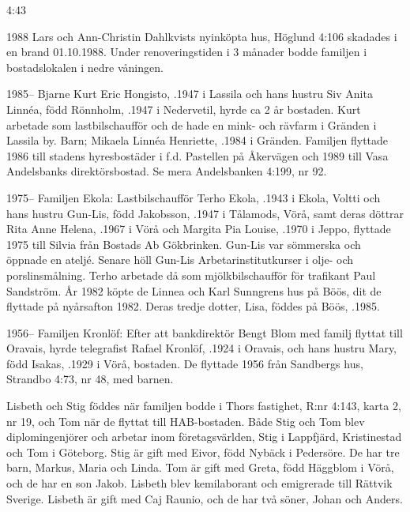  4:43

1988
Lars och Ann-Christin Dahlkvists nyinköpta hus, Höglund 4:106 skadades i en brand 01.10.1988. Under renoveringstiden i 3 månader bodde familjen i bostadslokalen i nedre våningen.


1985--
Bjarne Kurt Eric Hongisto, .1947 i Lassila och hans hustru Siv Anita Linnéa, född Rönnholm, .1947 i Nedervetil, hyrde ca 2 år bostaden. Kurt arbetade som lastbilschaufför och de hade en mink- och rävfarm i Gränden i Lassila by. Barn; Mikaela Linnéa Henriette, .1984 i Gränden. Familjen flyttade 1986 till stadens hyresbostäder i f.d. Pastellen på Åkervägen och 1989 till Vasa Andelsbanks direktörsbostad. Se mera Andelsbanken 4:199, nr	92.


1975--
Familjen Ekola:	Lastbilschaufför Terho Ekola, .1943 i Ekola, Voltti och hans hustru Gun-Lis, född Jakobsson, .1947 i Tålamods, Vörå, samt deras döttrar Rita Anne Helena, .1967 i Vörå och Margita Pia Louise, .1970 i Jeppo, flyttade 1975 till Silvia från Bostads Ab	Gökbrinken. Gun-Lis var sömmerska och öppnade en ateljé. Senare höll Gun-Lis Arbetarinstitutkurser i olje- och porslinsmålning. Terho arbetade då som mjölkbilschaufför för trafikant Paul Sandström. År 1982 	köpte de Linnea och Karl Sunngrens hus på Böös, dit de 	flyttade på nyårsafton 1982. Deras tredje dotter, Lisa, föddes på Böös, .1985.


1956--
Familjen Kronlöf:	Efter att bankdirektör Bengt Blom med familj flyttat till	Oravais, hyrde telegrafist Rafael Kronlöf, .1924 i Oravais, och hans hustru Mary, född Isakas, .1929 i Vörå, bostaden. De flyttade 1956 från Sandbergs hus, Strandbo 4:73, nr 48, med barnen.
\begin{jhchildren}
  \item {}
  \item {}
  \item {}
  \item {}
\end{jhchildren}
Lisbeth och Stig föddes när familjen bodde i Thors fastighet, R:nr 4:143, karta 2, nr 19, och Tom när de flyttat till HAB-bostaden. Både Stig och Tom blev diplomingenjörer och	arbetar inom företagsvärlden, Stig i Lappfjärd, Kristinestad 	och Tom i Göteborg. Stig är gift med Eivor, född Nybäck i Pedersöre. De har tre barn, Markus, Maria och Linda. Tom är gift med Greta, född Häggblom i Vörå, och de har en son Jakob. Lisbeth blev kemilaborant och emigrerade till Rättvik		Sverige. Lisbeth är gift med Caj Raunio, och de har två söner, Johan och Anders.

